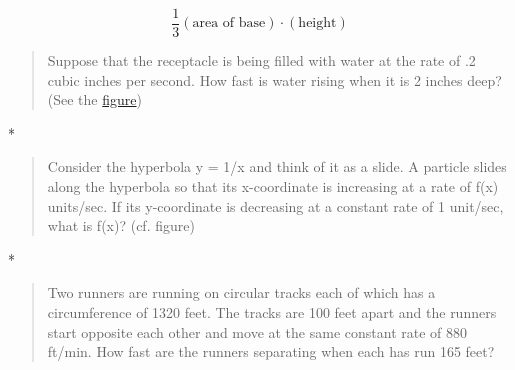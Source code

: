 \documentclass[12pt]{article}
\begin{document}
\[
\frac{1}{3}(\text{area of base}) \cdot (\text{height})
\]

\begin{quote}
Suppose that the receptacle is being filled with water at the rate of .2
cubic inches per second. How fast is water rising when it is 2 inches
deep? (See the
\href{http://oregonstate.edu/instruct/mth251/cq/Stage9/Practice/ratesProblems.html}{figure})
\end{quote}

*

\begin{quote}
Consider the hyperbola y = 1/x and think of it as a slide. A particle
slides along the hyperbola so that its x-coordinate is increasing at a
rate of f(x) units/sec. If its y-coordinate is decreasing at a constant
rate of 1 unit/sec, what is f(x)? (cf. figure)
\end{quote}

*

\begin{quote}
Two runners are running on circular tracks each of which has a
circumference of 1320 feet. The tracks are 100 feet apart and the
runners start opposite each other and move at the same constant rate of
880 ft/min. How fast are the runners separating when each has run 165
feet?
\end{quote}
\end{document}
